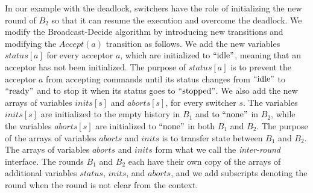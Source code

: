In our example with the deadlock, switchers have the role of initializing the new round of $B_2$ so that it can resume the execution and overcome the deadlock.
We modify the Broadcast-Decide algorithm by introducing new transitions and modifying the $Accept\left( a \right)$ transition as follows.
We add the new variables $status\left[ a \right]$ for every acceptor $a$, which are initialized to $\text{``idle''}$, meaning that an acceptor has not been initialized. The purpose of $status\left[ a \right]$ is to prevent the acceptor $a$ from accepting commands until its status changes from $\text{``idle''}$ to $\text{``ready''}$ and to stop it when its status goes to $\text{``stopped''}$.
We also add the new arrays of variables $inits\left[ s \right]$ and $aborts\left[ s \right]$, for every switcher $s$. The variables $inits\left[ s \right]$ are initialized to the empty history in $B_1$ and to $\text{``none''}$ in $B_2$, while the variables $aborts\left[ s \right]$ are initialized to $\text{``none''}$ in both $B_1$ and $B_2$. The purpose of the arrays of variables $aborts$ and $inits$ is to transfer state between $B_1$ and $B_2$. The arrays of variables $aborts$ and $inits$ form what we call the \emph{inter-round} interface.
The rounds $B_1$ and $B_2$ each have their own copy of the arrays of additional variables $status$, $inits$, and $aborts$, and we add subscripts denoting the round when the round is not clear from the context. 

